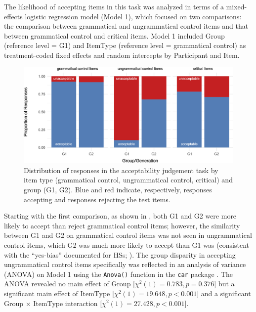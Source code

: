 \documentclass[output=paper,colorlinks,citecolor=brown]{langscibook}
\begin{document}
The likelihood of accepting items in this task was analyzed in terms of a mixed-effects logistic regression model (Model 1), which focused on two comparisons: the comparison between grammatical and ungrammatical control items and that between grammatical control and critical items. Model 1 included Group (reference level = G1) and ItemType (reference level = grammatical control) as treatment-coded fixed effects and random intercepts by Participant and Item.

\begin{figure}
\includegraphics[width=\textwidth]{figures/Fig1.png}
\caption{Distribution of responses in the acceptability judgement task by item type (grammatical control, ungrammatical control, critical) and group (G1, G2). Blue and red indicate, respectively, responses accepting and responses rejecting the test items.}
\label{fig:AJT}
\end{figure}

Starting with the first comparison, as shown in , both G1 and G2 were more likely to accept than reject grammatical control items; however, the similarity between G1 and G2 on grammatical control items was not seen in ungrammatical control items, which G2 was much more likely to accept than G1 was (consistent with the “yes-bias” documented for HSs; \citealt{Polinsky2018}). The group disparity in accepting ungrammatical control items specifically was reflected in an analysis of variance (ANOVA) on Model 1 using the \texttt{Anova()} function in the \texttt{car} package \citep{FoxWeisberg2019}. The ANOVA revealed no main effect of Group [$\chi^{2}(1)=0.783,\allowbreak p=0.376$] but a significant main effect of ItemType [$\chi^{2}(1)=19.648,\allowbreak p<0.001$] and a significant Group $\times$ ItemType interaction [$\chi^{2}(1)=27.428,\allowbreak p<0.001$]. 
\end{document}
